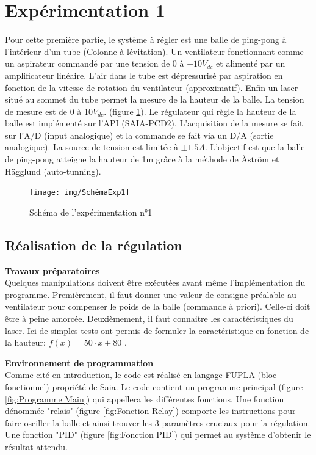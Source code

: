 \section{Expérimentation 1}
Pour cette première partie, le système à régler est une balle de ping-pong à l'intérieur d'un tube (Colonne à lévitation). Un ventilateur fonctionnant comme un aspirateur commandé par une tension de 0 à  $\pm 10V_{dc}$ et alimenté par un amplificateur linéaire. L'air dans le tube est dépressurisé par aspiration en fonction de la vitesse de rotation du ventilateur (approximatif). Enfin un laser situé au sommet du tube permet la mesure de la hauteur de la balle. La tension de mesure est de 0 à 10$V_{dc}$. (figure \ref{fig:Schéma de l'expérimentation n°1}). Le régulateur qui règle la hauteur de la balle est implémenté sur l’API (SAIA-PCD2). L’acquisition de la mesure se fait sur l’A/D (input analogique) et la commande se fait via un D/A (sortie analogique). La source de tension est limitée à $\pm 1.5A$. L'objectif est que la balle de ping-pong atteigne la hauteur de 1m grâce à la méthode de Åström et Hägglund (auto-tunning).

\begin{figure}[h]
	\centering
	\texttt{[image: img/SchémaExp1]}
	\caption{Schéma de l'expérimentation n°1}
	\label{fig:Schéma de l'expérimentation n°1}
\end{figure}
\subsection{Réalisation de la régulation}
\textbf{Travaux préparatoires}\\
Quelques manipulations doivent être exécutées avant même l'implémentation du programme. Premièrement, il faut donner une valeur de consigne préalable au ventilateur pour compenser le poids de la balle (commande à priori). Celle-ci doit être à peine amorcée. Deuxièmement, il faut connaitre les caractéristiques du laser. Ici de simples tests ont permis de formuler la caractéristique en fonction de la hauteur: $f(x)=50\cdot x + 80$ .\\

\vspace{0.1cm}

\textbf{Environnement de programmation}\\
Comme cité en introduction, le code est réalisé en langage FUPLA (bloc fonctionnel) propriété de Saia. Le code contient un programme principal (figure \ref{fig:Programme Main}) qui appellera les différentes fonctions. Une fonction dénommée "relais" (figure \ref{fig:Fonction Relay}) comporte les instructions pour faire osciller la balle et ainsi trouver les 3 paramètres cruciaux pour la régulation. Une fonction "PID"  (figure \ref{fig:Fonction PID}) qui permet au système d'obtenir le résultat attendu.

